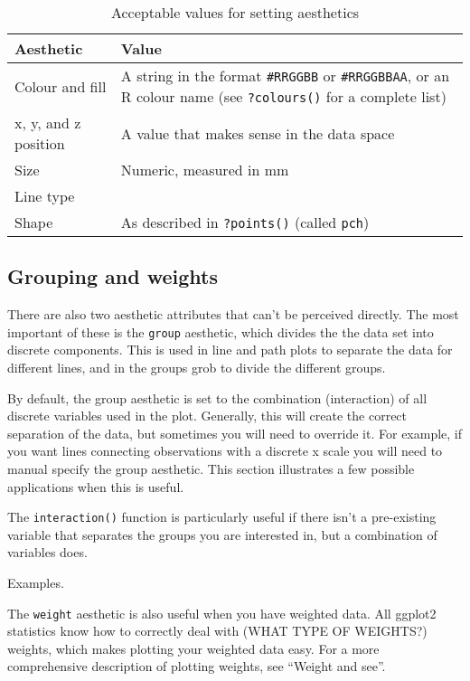 \begin{table}
  \begin{tabular}{lp{2in}}
    \toprule
    Aesthetic & Value \\
    \midrule
    Colour and fill & A string in the format {\tt \#RRGGBB} or {\tt \#RRGGBBAA}, or an R colour name (see {\tt ?colours()} for a complete list) \\
    x, y, and z position & A value that makes sense in the data space \\ 
    Size & Numeric, measured in mm\\
    Line type &  \\
    Shape & As described in {\tt ?points()} (called {\tt pch}) \\
    \bottomrule
  \end{tabular}
  \caption{Acceptable values for setting aesthetics}
  \label{label}
\end{table}


\subsection{Grouping and weights}
\label{sub:grouping}

There are also two aesthetic attributes that can't be perceived directly.  The most important of these is the {\tt group} aesthetic, which divides the the data set into discrete components.   This is used in line and path plots to separate the data for different lines, and in the groups grob to divide the different groups. 

By default, the group aesthetic is set to the combination (interaction) of all discrete variables used in the plot.  Generally, this will create the correct separation of the data, but sometimes you will need to override it.  For example, if you want lines connecting observations with a discrete x scale you will need to manual specify the group aesthetic.  This section illustrates a few possible applications when this is useful.

The {\tt interaction()} function is particularly useful if there isn't a pre-existing variable that separates the groups you are interested in, but a combination of variables does.  

Examples.

The {\tt weight} aesthetic is also useful when you have weighted data.  All ggplot2 statistics know how to correctly deal with (WHAT TYPE OF WEIGHTS?) weights, which makes plotting your weighted data easy.  For a more comprehensive description of plotting weights, see ``Weight and see''.

